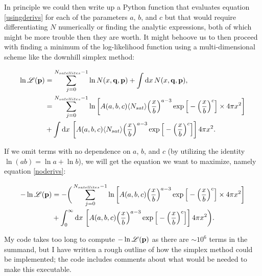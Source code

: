 In principle we could then write up a Python function that evaluates equation \eqref{usingderivs} for each of the parameters $a$, $b$, and $c$ but that would require differentiating $N$ numerically or finding the analytic expressions, both of which might be more trouble then they are worth. It might behoove us to then proceed with finding a minimum of the log-likelihood function using a multi-dimensional scheme like the downhill simplex method:

\begin{align}
\ln \mathcal{L}(\mathbf{p}) &= \sum_{j=0}^{N_{satellites} - 1} \ln N(x, \mathbf{q}, \mathbf{p}) + \int {\rm d} x \, N(x, \mathbf{q}, \mathbf{p}), \\
&= \sum_{j=0}^{N_{satellites} - 1} \ln \left[A(a,b,c) \langle N_{sat} \rangle \Big({x\over b}\Big)^{a-3} \exp\Big[-\Big({x\over b}\Big)^{c}\Big] \times 4\pi x^{2} \right] \\ \notag &+ \int {\rm d} x \, \left[A(a,b,c) \langle N_{sat} \rangle \Big({x\over b}\Big)^{a-3} \exp\Big[-\Big({x\over b}\Big)^{c}\Big] \right] 4\pi x^{2}.
\end{align}

If we omit terms with no dependence on $a$, $b$, and $c$ (by utilizing the identity $\ln(ab) = \ln a + \ln b$), we will get the equation we want to maximize, namely equation \eqref{noderivs}:

\begin{align}
\label{noderivs} -\ln \mathcal{L}(\mathbf{p}) &= -\bigg(\sum_{j=0}^{N_{satellites} - 1} \ln \left[A(a,b,c) \Big({x\over b}\Big)^{a-3} \exp\Big[-\Big({x\over b}\Big)^{c}\Big] \times 4\pi x^{2} \right] \\ \notag &+ \int_{0}^{\infty} {\rm d} x \, \left[A(a,b,c)  \Big({x\over b}\Big)^{a-3} \exp\Big[-\Big({x\over b}\Big)^{c}\Big] \right] 4\pi x^{2}\bigg).
\end{align}

My code takes too long to compute $-\ln \mathcal{L}(\mathbf{p})$ as there are $\sim 10^{6}$ terms in the summand, but I have written a rough outline of how the simplex method could be implemented; the code includes comments about what would be needed to make this executable.


